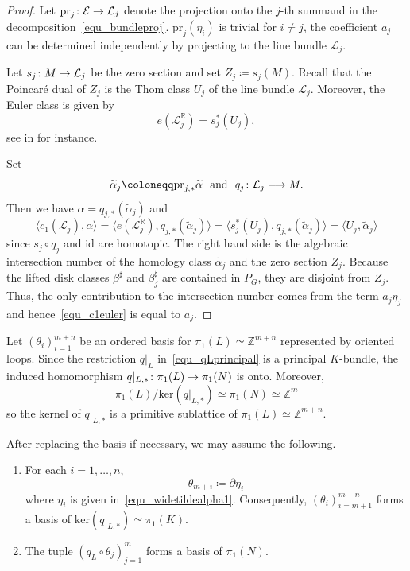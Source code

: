 \documentclass[11pt]{amsart}
\theoremstyle{plain}
\theoremstyle{definition}
\theoremstyle{remark}
\newcommand{\R}{\mathbb{R}}
\newcommand{\Z}{\mathbb{Z}}
\numberwithin{equation}{section} \numberwithin{table}{section}
\def\to{\mathchoice{\longrightarrow}{\rightarrow}{\rightarrow}{\rightarrow}}
\numberwithin{equation}{section}
\begin{document}
\begin{proof}
Let $\mathrm{pr}_j \colon \mathcal{E} \to \mathcal{L}_j$ denote the projection onto the $j$-th summand in the decomposition~\eqref{equ_bundleproj}.
$\mathrm{pr}_j (\eta_i)$ is trivial for $i \neq j$, the coefficient $a_j$ can be determined independently by projecting to the line bundle $\mathcal L_j$.

Let $s_j \colon M \to \mathcal{L}_j$ be the zero section and set $Z_j \coloneqq s_j(M)$. Recall that the Poincar\'{e} dual of $Z_j$ is the Thom class $U_j$ of the line bundle $\mathcal{L}_j$. Moreover, the Euler class is given by 
$$
e(\mathcal{L}^\R_{j}) = s_j^* (U_j),
$$
see in \cite[Section 6]{BT82} for instance.  

Set
$$
\widetilde{\alpha}_j \coloneqq \mathrm{pr}_{j,*} \widetilde{\alpha} \,\, \mbox{ and } \,\, q_j \colon \mathcal{L}_j \to M.
$$
Then we have $\alpha = q_{j,*} (\widetilde{\alpha}_j)$ and
\begin{equation}\label{equ_c1euler}
\langle c_1(\mathcal{L}_j), \alpha \rangle = \langle e(\mathcal{L}^\R_{j}), q_{j,*} (\widetilde{\alpha}_j) \rangle = 
\langle s_j^* (U_{j}),  q_{j,*} (\widetilde{\alpha}_j) \rangle = 
\langle  U_j, \widetilde{\alpha}_j \rangle
\end{equation} 
since $s_j \circ q_j$ and $\mathrm{id}$ are homotopic. The right hand side is the algebraic intersection number of the homology class $\widetilde{\alpha}_j$ and the zero section $Z_j$. Because the lifted disk classes $\beta^\sharp$ and $\beta_j^\sharp$ are contained in $P_G$, they are disjoint from $Z_j$. Thus, the only contribution to the intersection number comes from the term $a_j \eta_j$ and hence~\eqref{equ_c1euler} is equal to $a_j$.
\end{proof}

Let $(\theta_i)_{i=1}^{m+n}$ be an ordered basis for $\pi_1(L) \simeq \Z^{m+n}$ represented by oriented loops. Since the restriction $q |_L$ in~\eqref{equ_qLprincipal} is a principal $K$-bundle, the induced homomorphism $q |_{L,*} \colon \pi_1(L) \to \pi_1(N)$ is onto. Moreover,
$$
\pi_1(L) / \mathrm{ker}( q |_{L,*} ) \simeq \pi_1(N) \simeq \Z^m
$$
so the kernel of $q |_{L,*}$ is a primitive sublattice of $\pi_1(L) \simeq \Z^{m+n}$. 

After replacing the basis if necessary, we may assume the following. 
\begin{enumerate}
\item For each $i = 1, \dots, n$, 
$$
\theta_{m+i} \coloneqq \partial \eta_i
$$  
where $\eta_i$ is given in~\eqref{equ_widetildealpha1}. Consequently, $(\theta_i)_{i={m+1}}^{m+n}$ forms a basis of $\mathrm{ker}(q |_{L,*}) \simeq \pi_1(K)$.
\item The tuple $(q_{L} \circ \theta_j)_ {j=1}^m$ forms a basis of $\pi_1(N)$.
\end{enumerate}
\end{document}

